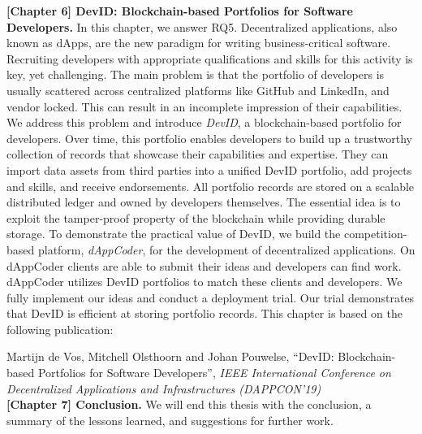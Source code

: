 \textbf{[Chapter 6] DevID: Blockchain-based Portfolios for Software Developers.}
In this chapter, we answer RQ5.
Decentralized applications, also known as dApps, are the new paradigm for writing business-critical software.
Recruiting developers with appropriate qualifications and skills for this activity is key, yet challenging.
The main problem is that the portfolio of developers is usually scattered across centralized platforms like GitHub and LinkedIn, and vendor locked.
This can result in an incomplete impression of their capabilities.
We address this problem and introduce \emph{DevID}, a blockchain-based portfolio for developers.
Over time, this portfolio enables developers to build up a trustworthy collection of records that showcase their capabilities and expertise.
They can import data assets from third parties into a unified DevID portfolio, add projects and skills, and receive endorsements.
All portfolio records are stored on a scalable distributed ledger and owned by developers themselves.
The essential idea is to exploit the tamper-proof property of the blockchain while providing durable storage.
To demonstrate the practical value of DevID, we build the competition-based platform, \emph{dAppCoder}, for the development of decentralized applications.
On dAppCoder clients are able to submit their ideas and developers can find work.
dAppCoder utilizes DevID portfolios to match these clients and developers.
We fully implement our ideas and conduct a deployment trial.
Our trial demonstrates that DevID is efficient at storing portfolio records.
This chapter is based on the following publication:

Martijn de Vos, Mitchell Olsthoorn and Johan Pouwelse, \enquote{DevID: Blockchain-based Portfolios for Software Developers}, \emph{IEEE International Conference on Decentralized Applications and Infrastructures (DAPPCON'19)}\\

\textbf{[Chapter 7] Conclusion.} We will end this thesis with the conclusion, a summary of the lessons learned, and suggestions for further work.


